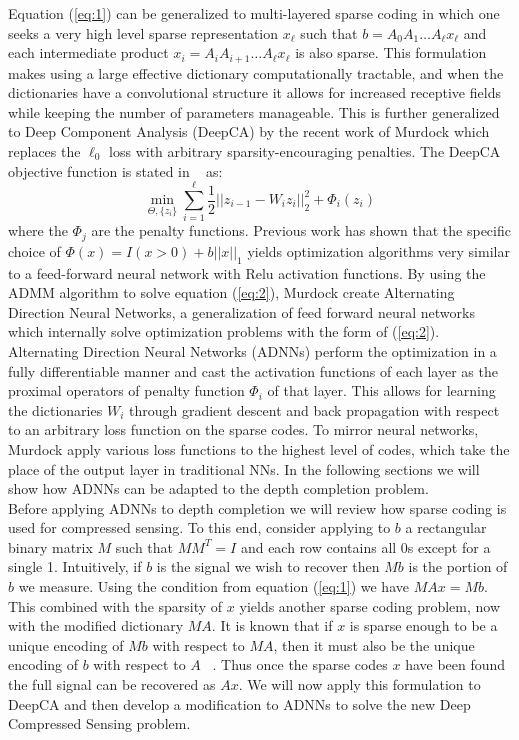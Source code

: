 Equation (\ref{eq:1}) can be generalized to multi-layered sparse coding in which one seeks a very high level sparse representation $x_{\ell}$ such that $b = A_0A_1\ldots A_{\ell}x_{\ell}$ and each intermediate product $x_i = A_iA_{i+1}\ldots A_{\ell}x_{\ell}$ is also sparse. This formulation makes using a large effective dictionary computationally tractable, and when the dictionaries have a convolutional structure it allows for increased receptive fields while keeping the number of parameters manageable. This is further generalized to Deep Component Analysis (DeepCA) by the recent work of Murdock \etal which replaces the $\ell_0$ loss with arbitrary sparsity-encouraging penalties. The DeepCA objective function is stated in ~\cite{mudock} as:
\begin{equation}
  \label{eq:2}
  \min_{\Theta, \{z_i\}} \sum_{i=1}^{\ell} \frac{1}{2} \left|| z_{i-1} - W_iz_i\right||_2^2 + \Phi_i(z_i)
\end{equation}
where the $\Phi_j$ are the penalty functions. Previous work has shown that the specific choice of $\Phi(x) = I(x > 0) + b\left||x\right||_1$ yields optimization algorithms very similar to a feed-forward neural network with Relu activation functions. By using the ADMM algorithm to solve equation (\ref{eq:2}), Murdock \etal create Alternating Direction Neural Networks, a generalization of feed forward neural networks which internally solve optimization problems with the form of (\ref{eq:2}). Alternating Direction Neural Networks (ADNNs) perform the optimization in a fully differentiable manner and cast the activation functions of each layer as the proximal operators of penalty function $\Phi_i$ of that layer. This allows for learning the dictionaries $W_i$ through gradient descent and back propagation with respect to an arbitrary loss function on the sparse codes. To mirror neural networks, Murdock \etal apply various loss functions to the highest level of codes, which take the place of the output layer in traditional NNs. In the following sections we will show how ADNNs can be adapted to the depth completion problem.\\

Before applying ADNNs to depth completion we will review how sparse coding is used for compressed sensing. To this end, consider applying to $b$ a rectangular binary matrix $M$ such that $MM^T = I$ and each row contains all 0s except for a single 1. Intuitively, if $b$ is the signal we wish to recover then $Mb$ is the portion of $b$ we measure. Using the condition from equation (\ref{eq:1}) we have $MAx = Mb$. This combined with the sparsity of $x$ yields another sparse coding problem, now with the modified dictionary $MA$. It is known that if $x$ is sparse enough to be a unique encoding of $Mb$ with respect to $MA$, then it must also be the unique encoding of $b$ with respect to $A$ ~\cite{elad}. Thus once the sparse codes $x$ have been found the full signal can be recovered as $Ax$. We will now apply this formulation to DeepCA and then develop a modification to ADNNs to solve the new Deep Compressed Sensing problem.


